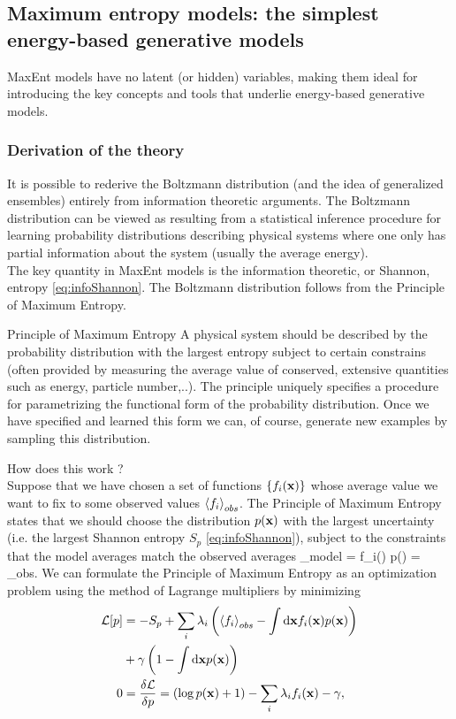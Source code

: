 \subsection{Maximum entropy models: the simplest energy-based generative models}
\label{subsec:energyMaxEnt}
MaxEnt models have no latent (or hidden) variables, making them ideal for introducing the key concepts and tools that underlie energy-based generative models.
\subsubsection{Derivation of the theory}
It is possible to rederive the Boltzmann distribution (and the idea of generalized ensembles) entirely from information theoretic arguments. The Boltzmann distribution can be viewed as resulting from a statistical inference procedure for learning probability distributions describing physical systems where one only has partial information about the system (usually the average energy).\\
The key quantity in MaxEnt models is the information theoretic, or Shannon, entropy \ref{eq:infoShannon}. The Boltzmann distribution follows from the Principle of Maximum Entropy.
\begin{mybox}{Principle of Maximum Entropy}
A physical system should be described by the probability distribution with the largest entropy subject to certain constrains (often provided by measuring the average value of conserved, extensive quantities such as energy, particle number,..). The principle uniquely specifies a procedure for parametrizing the functional form of the probability distribution. Once we have specified and learned this form we can, of course, generate new examples by sampling this distribution.
\end{mybox}
How does this work ?\\
Suppose that we have chosen a set of functions $\{f_i(\mathbf{x})\}$ whose average value we want to fix to some observed values $\expval{f_i}_{obs}$. The Principle of Maximum Entropy states that we should choose the distribution $p(\mathbf{x})$ with the largest uncertainty (i.e. the largest Shannon entropy $S_p$ \ref{eq:infoShannon}), subject to the constraints that the model averages match the observed averages
\be 
{}_{model} = \int \md \mx f_i(\mx) p(\mx) = _{obs}.
\ee 
We can formulate the Principle of Maximum Entropy as an optimization problem using the method of Lagrange multipliers by minimizing 
\begin{align*}
	\mathcal{L}[p] &= -S_p + \sum_i \lambda_i \left(\expval{f_i}_{obs} - \int \mathrm{d} \mathbf{x} f_i (\mathbf{x}) p(\mathbf{x}) \right)\\
	&+ \gamma \left(1- \int \mathrm{d} \mathbf{x} p(\mathbf{x})\right)\\
	0&=\frac{\delta \mathcal{L}}{\delta p} = (\log p(\mathbf{x}) +1) - \sum_i \lambda_i f_i(\mathbf{x}) -\gamma,
\end{align*}
